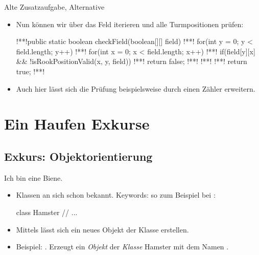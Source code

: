 \begin{frame}[fragile]{Alte Zusatzaufgabe, Alternative}
    \begin{itemize}[<+(1)->]
        \item Nun können wir über das Feld iterieren und alle Turmpositionen prüfen:
\begin{plainjava}
!**!public static boolean checkField(boolean[][] field) {
!**!    for(int y = 0; y < field.length; y++) {
!**!        for(int x = 0; x < field.length; x++) {
!**!            if(field[y][x] && !isRookPositionValid(x, y, field))
!**!                return false;
!**!        }
!**!    }
!**!    return true;
!**!}
\end{plainjava}
        \item<8-> Auch hier lässt sich die Prüfung beispielsweise durch einen Zähler erweitern.
    \end{itemize}
\end{frame}

\section{Ein Haufen Exkurse}
\subsection{Exkurs: Objektorientierung}
\begin{frame}[t,fragile]{Ich bin eine Biene.}
    \begin{itemize}[<+(1)->]
        \item Klassen an sich schon bekannt.\pause{} Keywords:  so zum Beispiel bei :\pause{}
        \begin{java}[morekeywords={[2]{Hamster}}]
class Hamster {
    // ...
}
        \end{java}
        \item Mittels  lässt sich ein neues Objekt der Klasse erstellen.
        \item Beispiel: .\pause{} Erzeugt ein \emph{Objekt} der \emph{Klasse} Hamster mit dem Namen .\pause{} 
    \end{itemize}
\end{frame}

